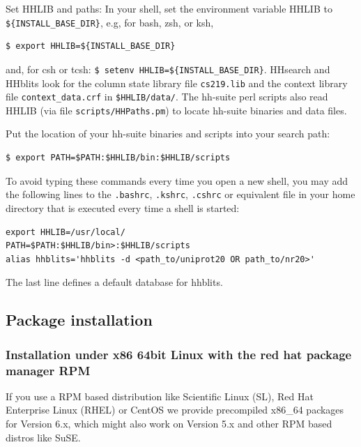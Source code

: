 \documentclass[11pt,a4paper]{article}
\begin{document}
\begin{enum}
\item Set HHLIB and paths: In your shell, set the environment variable HHLIB to \verb`${INSTALL_BASE_DIR}`, 
e.g, for bash, zsh, or ksh,
\begin{verbatim}
$ export HHLIB=${INSTALL_BASE_DIR}
\end{verbatim}
and, for csh or tcsh: \verb`$ setenv HHLIB=${INSTALL_BASE_DIR}`. 
HHsearch and HHblits look for the column state library file \verb`cs219.lib`
and the context library file \verb`context_data.crf` in \verb`$HHLIB/data/`. The hh-suite
perl scripts also read HHLIB (via file \verb`scripts/HHPaths.pm`) to locate hh-suite binaries and data files.

Put the location of your hh-suite binaries and scripts into your search path:
\begin{verbatim}
$ export PATH=$PATH:$HHLIB/bin:$HHLIB/scripts
\end{verbatim}

To avoid typing these commands every time you open a new shell, you may add the following lines to the \verb`.bashrc`, \verb`.kshrc`, \verb`.cshrc` or equivalent file in your home directory that is executed every time a shell is started:
\begin{verbatim}
export HHLIB=/usr/local/
PATH=$PATH:$HHLIB/bin>:$HHLIB/scripts
alias hhblits='hhblits -d <path_to/uniprot20 OR path_to/nr20>'
\end{verbatim}
The last line defines a default database for hhblits. 
\vspace{2mm}

\end{enum}

\subsection{Package installation}

\subsubsection*{Installation under x86 64bit Linux with the red hat package manager RPM}

If you use a RPM based distribution like Scientific Linux (SL), Red Hat Enterprise Linux (RHEL) or CentOS we provide precompiled x86\_64 packages for
Version 6.x, which might also work on Version 5.x and other RPM based distros
like SuSE.
\end{document}
